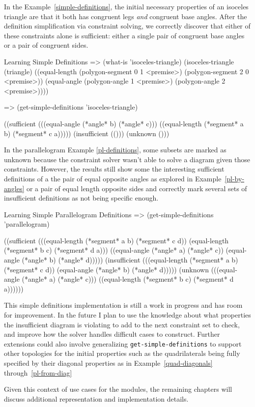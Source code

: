 In the Example~\ref{simple-definitions}, the initial necessary
properties of an isoceles triangle are that it both has congruent
legs \emph{and} congruent base angles. After the definition
simplification via constraint solving, we correctly discover that
either of these constraints alone is sufficient: either a single pair
of congruent base angles or a pair of congruent sides.

\begin{repl-example}
[label=simple-definitions]
{Learning Simple Definitions}
=> (what-is 'isoceles-triangle)
(isoceles-triangle
 (triangle)
 ((equal-length (polygon-segment 0 1 <premise>)
                (polygon-segment 2 0 <premise>))
  (equal-angle (polygon-angle 1 <premise>) (polygon-angle 2 <premise>))))

=> (get-simple-definitions 'isoceles-triangle)

((sufficient
  (((equal-angle (*angle* b) (*angle* c)))
   ((equal-length (*segment* a b) (*segment* c a)))))
 (insufficient (()))
 (unknown ()))
\end{repl-example}

In the parallelogram Example \ref{pl-definitions}, some subsets are
marked as unknown because the constraint solver wasn't able to solve a
diagram given those constraints. However, the results still show some
the interesting sufficient definitions of a the pair of equal opposite
angles as explored in Example~\ref{pl-by-angles} or a pair of equal
length opposite sides and correctly mark several sets of insufficient
definitions as not being specific enough.

\begin{repl-example}
[label=pl-definitions]
{Learning Simple Parallelogram Definitions}
=> (get-simple-definitions 'parallelogram)

((sufficient
  (((equal-length (*segment* a b) (*segment* c d))
    (equal-length (*segment* b c) (*segment* d a)))
   ((equal-angle (*angle* a) (*angle* c))
    (equal-angle (*angle* b) (*angle* d)))))
 (insufficient
  (((equal-length (*segment* a b) (*segment* c d))
    (equal-angle (*angle* b) (*angle* d)))))
 (unknown
  (((equal-angle (*angle* a) (*angle* c)))
   ((equal-length (*segment* b c) (*segment* d a))))))
\end{repl-example}

This simple definitions implementation is still a work in progress and
has room for improvement. In the future I plan to use the knowledge
about what properties the insufficient diagram is violating to add to
the next constraint set to check, and improve how the solver handles
difficult cases to construct. Further extensions could also involve
generalizing \texttt{get-simple-definitions} to support other
topologies for the initial properties such as the quadrilaterals being
fully specified by their diagonal properties as in
Example~\ref{quad-diagonals} through~\ref{pl-from-diag}

Given this context of use cases for the modules, the remaining
chapters will discuss additional representation and implementation
details.
